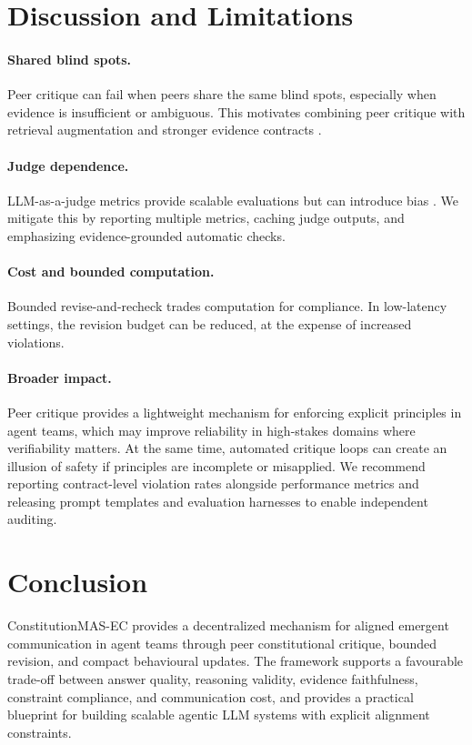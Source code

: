 \documentclass{article}
\newcommand{\framework}{ConstitutionMAS-EC\xspace}
\theoremstyle{plain}
\theoremstyle{definition}
\begin{document}
\section{Discussion and Limitations}
\label{sec:limitations}
\paragraph{Shared blind spots.}
Peer critique can fail when peers share the same blind spots, especially when evidence is insufficient or ambiguous. This motivates combining peer critique with retrieval augmentation and stronger evidence contracts \citep{lewis2020rag,izacard2021distill}.

\paragraph{Judge dependence.}
LLM-as-a-judge metrics provide scalable evaluations but can introduce bias \citep{zheng2023judging,wang2023surveyjudge}. We mitigate this by reporting multiple metrics, caching judge outputs, and emphasizing evidence-grounded automatic checks.

\paragraph{Cost and bounded computation.}
Bounded revise-and-recheck trades computation for compliance. In low-latency settings, the revision budget can be reduced, at the expense of increased violations.

\paragraph{Broader impact.}
Peer critique provides a lightweight mechanism for enforcing explicit principles in agent teams, which may improve reliability in high-stakes domains where verifiability matters. At the same time, automated critique loops can create an illusion of safety if principles are incomplete or misapplied. We recommend reporting contract-level violation rates alongside performance metrics and releasing prompt templates and evaluation harnesses to enable independent auditing.

\section{Conclusion}
\framework provides a decentralized mechanism for aligned emergent communication in agent teams through peer constitutional critique, bounded revision, and compact behavioural updates. The framework supports a favourable trade-off between answer quality, reasoning validity, evidence faithfulness, constraint compliance, and communication cost, and provides a practical blueprint for building scalable agentic LLM systems with explicit alignment constraints.
\end{document}

